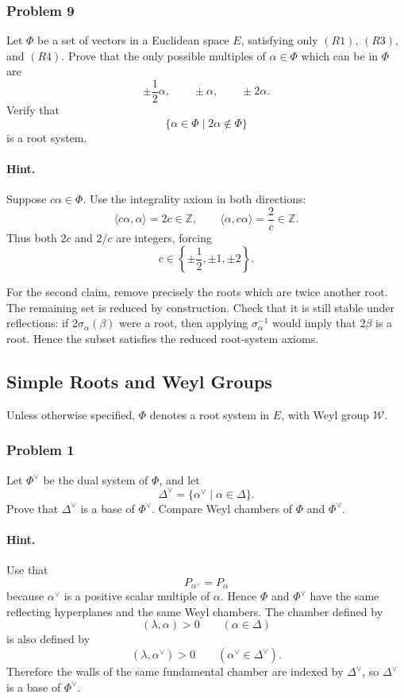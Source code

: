 \documentclass[12pt, a4paper]{article}
\begin{document}
\subsubsection{Problem 9}

Let \(\Phi\) be a set of vectors in a Euclidean space \(E\), satisfying only
\((R1)\), \((R3)\), and \((R4)\). Prove that the only possible multiples of
\(\alpha\in\Phi\) which can be in \(\Phi\) are
\[
\pm\frac{1}{2}\alpha,\qquad \pm\alpha,\qquad \pm2\alpha.
\]
Verify that
\[
\{\alpha\in\Phi\mid 2\alpha\notin\Phi\}
\]
is a root system.

\paragraph{Hint.}
Suppose \(c\alpha\in\Phi\). Use the integrality axiom in both directions:
\[
\langle c\alpha,\alpha\rangle=2c\in\mathbb Z,
\qquad
\langle \alpha,c\alpha\rangle=\frac{2}{c}\in\mathbb Z.
\]
Thus both \(2c\) and \(2/c\) are integers, forcing
\[
c\in\left\{\pm\frac12,\pm1,\pm2\right\}.
\]

For the second claim, remove precisely the roots which are twice another root.
The remaining set is reduced by construction. Check that it is still stable
under reflections: if \(2\sigma_\alpha(\beta)\) were a root, then applying
\(\sigma_\alpha^{-1}\) would imply that \(2\beta\) is a root. Hence the subset
satisfies the reduced root-system axioms.


\subsection{Simple Roots and Weyl Groups}

Unless otherwise specified, \(\Phi\) denotes a root system in \(E\), with Weyl
group \(\mathcal W\).

\subsubsection{Problem 1}

Let \(\Phi^\vee\) be the dual system of \(\Phi\), and let
\[
\Delta^\vee=\{\alpha^\vee\mid \alpha\in \Delta\}.
\]
Prove that \(\Delta^\vee\) is a base of \(\Phi^\vee\). Compare Weyl chambers of
\(\Phi\) and \(\Phi^\vee\).

\paragraph{Hint.}
Use that
\[
P_{\alpha^\vee}=P_\alpha
\]
because \(\alpha^\vee\) is a positive scalar multiple of \(\alpha\). Hence
\(\Phi\) and \(\Phi^\vee\) have the same reflecting hyperplanes and the same
Weyl chambers. The chamber defined by
\[
(\lambda,\alpha)>0\qquad(\alpha\in\Delta)
\]
is also defined by
\[
(\lambda,\alpha^\vee)>0\qquad(\alpha^\vee\in\Delta^\vee).
\]
Therefore the walls of the same fundamental chamber are indexed by
\(\Delta^\vee\), so \(\Delta^\vee\) is a base of \(\Phi^\vee\).
\end{document}
